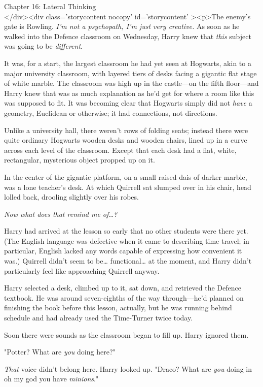 
Chapter 16: Lateral Thinking\\
</div><div  class='storycontent nocopy' id='storycontent' ><p>The enemy's gate 
is Rowling.
\sbreak
\emph{I'm not a psychopath, I'm just very creative.}
\sbreak
As soon as he walked into the Defence classroom on Wednesday, Harry knew that 
\emph{this} subject was going to be \emph{different}.

It was, for a start, the largest classroom he had yet seen at Hogwarts, akin to 
a major university classroom, with layered tiers of desks facing a gigantic 
flat stage of white marble. The classroom was high up in the castle---on the 
fifth floor---and Harry knew that was as much explanation as he'd get for where 
a room like this was supposed to fit. It was becoming clear that Hogwarts 
simply did not \emph{have} a geometry, Euclidean or otherwise; it had 
connections, not directions.

Unlike a university hall, there weren't rows of folding seats; instead there 
were quite ordinary Hogwarts wooden desks and wooden chairs, lined up in a 
curve across each level of the classroom. Except that each desk had a flat, 
white, rectangular, mysterious object propped up on it.

In the center of the gigantic platform, on a small raised dais of darker 
marble, was a lone teacher's desk. At which Quirrell sat slumped over in his 
chair, head lolled back, drooling slightly over his robes.

\emph{Now what does that remind me of{\ldots}?}

Harry had arrived at the lesson so early that no other students were there yet. 
(The English language was defective when it came to describing time travel; in 
particular, English lacked any words capable of expressing how convenient it 
was.) Quirrell didn't seem to be{\ldots} functional{\ldots} at the moment, and 
Harry didn't particularly feel like approaching Quirrell anyway.

Harry selected a desk, climbed up to it, sat down, and retrieved the Defence 
textbook. He was around seven-eighths of the way through---he'd planned on 
finishing the book before this lesson, actually, but he was running behind 
schedule and had already used the Time-Turner twice today.

Soon there were sounds as the classroom began to fill up. Harry ignored them.

"Potter? What are \emph{you} doing here?"

\emph{That} voice didn't belong here. Harry looked up. "Draco? What are 
\emph{you} doing in oh my god you have \emph{minions}."

